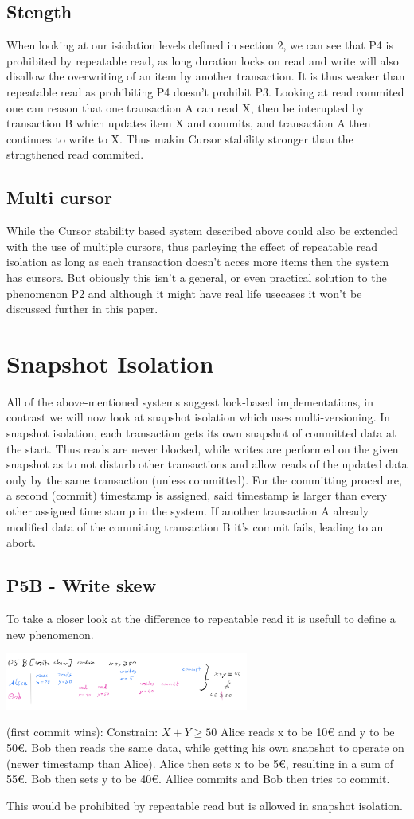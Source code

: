 \documentclass[sigconf, review=true]{acmart}
\begin{document}
\subsection{Stength}
When looking at our isiolation levels defined in section 2, we can see that P4 is prohibited by repeatable read,
as long duration locks on read and write will also disallow the overwriting of an item by another transaction.
It is thus weaker than repeatable read as prohibiting P4 doesn't prohibit P3.
Looking at read commited one can reason that one transaction A can read X, then be interupted by transaction B which updates
item X and commits, and transaction A then continues to write to X.
Thus makin Cursor stability stronger than the strngthened read commited.
\subsection{Multi cursor}
While the Cursor stability based system described above could also be extended with the use of multiple cursors, thus
parleying the effect of repeatable read isolation as long as each transaction doesn't acces more items
then the system has cursors. But obiously this isn't a general, or even practical solution to the phenomenon P2 and
although it might have real life usecases it won't be discussed further in this paper.
\section{Snapshot Isolation}
All of the above-mentioned systems suggest lock-based implementations, in contrast we will now look at
snapshot isolation which uses multi-versioning.
In snapshot isolation, each transaction gets its own snapshot of committed data at the start.
Thus reads are never blocked, while writes are performed on the given snapshot as to not disturb
other transactions and allow reads of the updated data only by the same transaction (unless committed).
For the committing procedure, a second (commit) timestamp is assigned, said timestamp is larger than every
other assigned time stamp in the system. If another transaction A already modified data of the commiting
transaction B it's commit fails, leading to an abort.
\subsection{P5B - Write skew}
To take a closer look at the difference to repeatable read it is usefull to define a new phenomenon.

\includegraphics[width=8cm]{P5}
\begin{example}
    (first commit wins):
    Constrain: $ X+Y \geq  50$
    Alice reads x to be 10€ and y to be 50€. Bob then reads the same data, while getting his own snapshot
    to operate on (newer timestamp than Alice). Alice then sets x to be 5€,
    resulting in a sum of 55€. Bob then sets y to be 40€. Allice commits and Bob then tries to commit.
\end{example}
This would be prohibited by repeatable read but is allowed in snapshot isolation.
\end{document}
